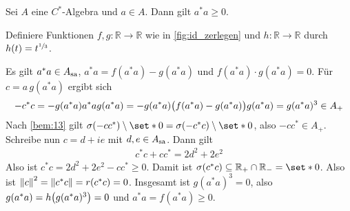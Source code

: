 \begin{satz}[label=satz:36,{name=[$a^*a$ ist positiv]}]
	Sei $A$ eine $C^*$-Algebra und $a \in A$. Dann gilt $a^*a \ge 0$.
\end{satz}
\begin{beweis}
	Definiere Funktionen $f,g \colon \mathbb{R} \to \mathbb{R}$ wie in \cref{fig:id_zerlegen} und $h \colon \mathbb{R} \to \mathbb{R}$ durch $h(t)=t^{\sfrac{1}{3}}$.
	\begin{figure}[t]
	\end{figure}
	Es gilt $a^*a \in A_{\sa}$, $a^*a = f(a^*a)- g(a^*a)$ und $f(a^*a) \cdot g(a^*a)=0$. 
	Für $c=a \,g(a^*a)$ ergibt sich
	\begin{align}
		-c^*c = -g(a^*a) a^*a g(a^*a) = -g(a^*a) \enbrace[\big]{f(a^*a) - g(a^*a)} g(a^*a) = g(a^*a)^3 \in A_+
	\end{align}
	Nach \autoref{bem:13} gilt $\sigma(-cc^*) \setminus \set*{0} = \sigma(-c^*c) \setminus \set*{0}$, also $-cc^* \in A_+$. 
	Schreibe nun $c=d + i e$ mit $d,e \in A_\sa$. Dann gilt
	\begin{align}
		c^*c+cc^* = 2d^2+ 2e^2
	\end{align}
	Also ist $c^*c= 2d^2+2e^2- cc^* \ge 0$. Damit ist $\sigma(c^*c) \subseteq \mathbb{R}_+ \cap \mathbb{R}_- = \set*{0}$. 
	Also ist $\norm*{c}^2= \norm*{c^*c}= r(c^*c)=0$. 
	Insgesamt ist $g(a^*a)^3=0$, also $g(a^*a)=h \enbrace*{g(a^*a)^3}=0$ und $a^*a=f(a^*a)\ge 0$.
\end{beweis}

